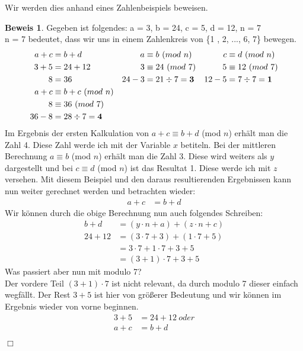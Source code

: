 \documentclass[12pt,a4paper]{article}
\theoremstyle{definition}
\newtheorem{beweis}{Beweis}[subsection]
\begin{document}
\newpage
Wir werden dies anhand eines Zahlenbeispiels beweisen.
\begin{beweis}Gegeben ist folgendes: a = 3, b = 24, c = 5, d = 12,  n = 7\\
n = 7 bedeutet, dass wir uns in einem Zahlenkreis von \{1 , 2, ..., 6, 7\} bewegen.
\begin{align}\setcounter{equation}{0}
a + c  &= b + d                  & a      &\equiv b\ (mod\ n)       & c      &\equiv d\ (mod\ n)     \\
3 + 5  &= 24 + 12                & 3      &\equiv 24\ (mod\ 7)      & 5      &\equiv 12\ (mod\ 7)    \\
8      &= 36                     & 24 - 3 &= 21 \div 7 = \textbf{3} & 12 - 5 &=7 \div 7 = \textbf{1} \\
a + c  &\equiv b + c\ (mod\ n)   &                                  &                                \\ 
8      &\equiv 36\ (mod\ 7)      &                                  &                                \\
36 - 8 &= 28 \div 7 = \textbf{4} &                                  &
\end{align}
Im Ergebnis der ersten Kalkulation von $a + c \equiv b + d$ (mod $n$) erhält man die Zahl 4.
Diese Zahl werde ich mit der Variable $x$ betiteln.
Bei der mittleren Berechnung $a \equiv b$ (mod $n$) erhält man die Zahl 3.
Diese wird weiters als $y$ dargestellt und bei $c \equiv d$ (mod $n$) ist das Resultat 1.
Diese werde ich mit $z$ versehen.
Mit diesem Beispiel und den daraus resultierenden Ergebnissen kann nun weiter gerechnet werden und betrachten wieder:
\begin{align}
a + c &= b + d
\end{align}
Wir können durch die obige Berechnung nun auch folgendes Schreiben:
\begin{align}
b + d   &= (y \cdot n + a) + (z \cdot n + c) \\
24 + 12 &= (3 \cdot 7 + 3) + (1 \cdot 7 + 5) \\
        &= 3 \cdot 7 + 1 \cdot 7 + 3 + 5     \\
        &= (3 + 1) \cdot 7 + 3 + 5
\end{align}
Was passiert aber nun mit modulo 7?\\
Der vordere Teil $(3 + 1) \cdot 7$ ist nicht relevant, da durch modulo 7 dieser einfach wegfällt.
Der Rest $3 + 5$ ist hier von größerer Bedeutung und wir können im Ergebnis wieder von vorne beginnen.
\begin{align}
3 + 5 &= 24 + 12\ oder \\
a + c &= b + d
\end{align}
\begin{flushright}
$\Box$
\end{flushright}
\end{beweis}
\end{document}
